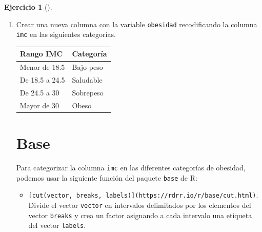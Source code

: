 \documentclass[
  a4paper,
]{scrreport}
\newenvironment{Shaded}{\begin{snugshade}}{\end{snugshade}}
\newcommand{\ExtensionTok}[1]{\textcolor[rgb]{0.00,0.23,0.31}{#1}}
\newcommand{\NormalTok}[1]{\textcolor[rgb]{0.00,0.23,0.31}{#1}}
\providecommand{\tightlist}{%
  \setlength{\itemsep}{0pt}\setlength{\parskip}{0pt}}\usepackage{longtable,booktabs,array}
\theoremstyle{definition}
\newtheorem{exercise}{Ejercicio}[chapter]
\theoremstyle{remark}
\begin{document}
\begin{exercise}[]
\begin{enumerate}
\begin{tcolorbox}
\begin{Shaded}
\begin{Highlighting}[]
\ExtensionTok{Crear}\NormalTok{ una nueva columna de nombre IMC con el índice de masa corporal de los pacientes usando la fórmula IMC = peso / altura\^{}2. Redondear el resultado a números enteros.}
\end{Highlighting}
\end{Shaded}

  \end{tcolorbox}
\item
  Crear una nueva columna con la variable \texttt{obesidad}
  recodificando la columna \texttt{imc} en las siguientes categorías.

  \begin{longtable}[]{@{}ll@{}}
  \toprule\noalign{}
  Rango IMC & Categoría \\
  \midrule\noalign{}
  \endhead
  \bottomrule\noalign{}
  \endlastfoot
  Menor de 18.5 & Bajo peso \\
  De 18.5 a 24.5 & Saludable \\
  De 24.5 a 30 & Sobrepeso \\
  Mayor de 30 & Obeso \\
  \end{longtable}

  \begin{tcolorbox}[enhanced jigsaw, colframe=quarto-callout-tip-color-frame, toprule=.15mm, bottomtitle=1mm, breakable, opacitybacktitle=0.6, toptitle=1mm, colback=white, bottomrule=.15mm, title=\textcolor{quarto-callout-tip-color}{\faLightbulb}\hspace{0.5em}{Solución}, arc=.35mm, left=2mm, titlerule=0mm, rightrule=.15mm, coltitle=black, leftrule=.75mm, opacityback=0, colbacktitle=quarto-callout-tip-color!10!white]

  \section{Base}

  Para categorizar la columna \texttt{imc} en las diferentes categorías
  de obesidad, podemos usar la siguiente función del paquete
  \texttt{base} de R:

  \begin{itemize}
  \tightlist
  \item
    \texttt{{[}cut(vector,\ breaks,\ labels){]}(https://rdrr.io/r/base/cut.html)}.
    Divide el vector \texttt{vector} en intervalos delimitados por los
    elementos del vector \texttt{breaks} y crea un factor asignando a
    cada intervalo una etiqueta del vector \texttt{labels}.
  \end{itemize}


\end{tcolorbox}
\end{enumerate}
\end{exercise}
\end{document}
